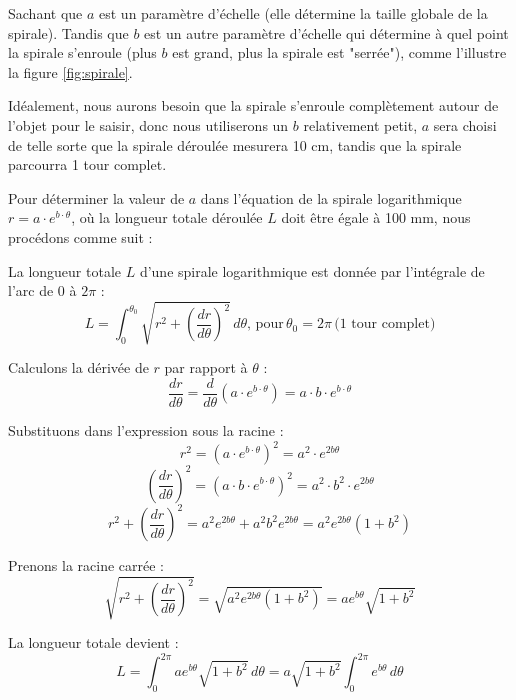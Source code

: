 \documentclass[a4paper, 11pt]{report}
\begin{document}
            Sachant que $a$ est un paramètre d’échelle (elle détermine la taille globale de la spirale). Tandis que $b$ est un autre paramètre d’échelle qui détermine à quel point la spirale s’enroule (plus $b$ est grand, plus la spirale est "serrée"), comme l'illustre la figure \ref{fig:spirale}.
            
            Idéalement, nous aurons besoin que la spirale s'enroule complètement autour de l'objet pour le saisir, donc nous utiliserons un $b$ relativement petit, $a$ sera choisi de telle sorte que la spirale déroulée mesurera 10 cm, tandis que la spirale parcourra 1 tour complet.
        
            Pour déterminer la valeur de \( a \) dans l'équation de la spirale logarithmique \( r = a \cdot e^{b \cdot \theta} \), où la longueur totale déroulée \( L \) doit être égale à 100 mm, nous procédons comme suit :

            La longueur totale \( L \) d'une spirale logarithmique est donnée par l'intégrale de l'arc de $0$ à $2\pi$ :
            \[
            L = \int_0^{\theta_0} \sqrt{r^2 + \left(\frac{dr}{d\theta}\right)^2} \, d\theta, \, \text{pour} \, \theta_0 = 2\pi \, \text{(1 tour complet)}
            \]
            
            Calculons la dérivée de \( r \) par rapport à \( \theta \) :
            \[
            \frac{dr}{d\theta} = \frac{d}{d\theta} \left( a \cdot e^{b \cdot \theta} \right) = a \cdot b \cdot e^{b \cdot \theta}
            \]
            
            Substituons dans l'expression sous la racine :
            \[
            r^2 = \left( a \cdot e^{b \cdot \theta} \right)^2 = a^2 \cdot e^{2b \theta}
            \]
            \[
            \left( \frac{dr}{d\theta} \right)^2 = \left( a \cdot b \cdot e^{b \cdot \theta} \right)^2 = a^2 \cdot b^2 \cdot e^{2b \theta}
            \]
            \[
            r^2 + \left( \frac{dr}{d\theta} \right)^2 = a^2 e^{2b \theta} + a^2 b^2 e^{2b \theta} = a^2 e^{2b \theta} (1 + b^2)
            \]
            
            Prenons la racine carrée :
            \[
            \sqrt{r^2 + \left( \frac{dr}{d\theta} \right)^2} = \sqrt{a^2 e^{2b \theta} (1 + b^2)} = a e^{b \theta} \sqrt{1 + b^2}
            \]
            
            La longueur totale devient :
            \[
            L = \int_0^{2\pi} a e^{b \theta} \sqrt{1 + b^2} \, d\theta = a \sqrt{1 + b^2} \int_0^{2\pi} e^{b \theta} \, d\theta
            \]
            
\end{document}
